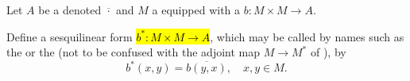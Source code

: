 \begin{definition} \label{definition:conjugate_transpose_sesquilinear_form_of_a_sesquilinear_form_on_a_module_over_a_ring_with_involution}
    Let $A$ be a  denoted $\overline{\cdot}$ and $M$ a  equipped with a  $b: M \times M \to A$. 

    Define a sesquilinear form \hl{$b^*: M \times M \to A$}, which may be called by names such as the  or the  (not to be confused with the adjoint map $M \to M^*$ of ), by 
    $$b^{*}(x, y)=\overline{b(y, x)}, \quad x, y \in M.$$

\end{definition}
